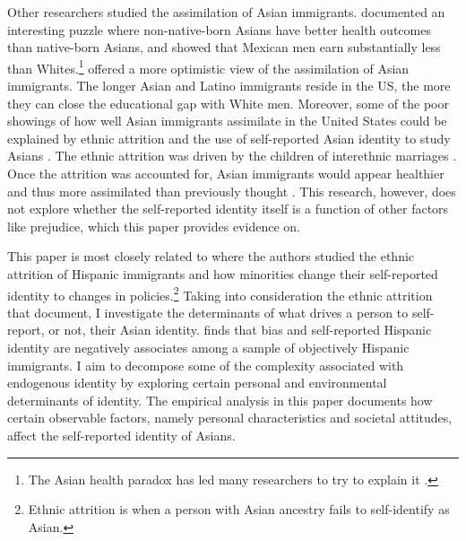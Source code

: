 Other researchers studied the assimilation of Asian immigrants. \textcite{antecolUnhealthyAssimilationWhy2006} documented an interesting puzzle where non-native-born Asians have better health outcomes than native-born Asians, and \textcite{trejoWhyMexicanAmericans1997} showed that Mexican men earn substantially less than Whites.\footnote{The Asian health paradox has led many researchers to try to explain it \autocite{giuntellaAssimilationHealthEvidence2016,giuntellaAccelerationImmigrantUnhealthy2017,giuntellaReasonImmigrationImmigrants2018,giuntellaWhyDoesHealth2017a,antmanEthnicAttritionObserved2016,antmanEthnicAttritionAssimilation2020}.} \textcite{smithAssimilationLatinoGenerations2003} offered a more optimistic view of the assimilation of Asian immigrants. The longer Asian and Latino immigrants reside in the US, the more they can close the educational gap with White men. Moreover, some of the poor showings of how well Asian immigrants assimilate in the United States could be explained by ethnic attrition and the use of self-reported Asian identity to study Asians \autocite{duncanComplexityImmigrantGenerations2017,duncanWhoRemainsMexican2011,mengIntermarriageEconomicAssimilation2005,duncanIdentifyingLaterGenerationDescendants2018,duncanSocioeconomicIntegrationImmigrant2018,antmanEthnicAttritionObserved2016,antmanEthnicAttritionAssimilation2020}. The ethnic attrition was driven by the children of interethnic marriages \autocite{mengIntermarriageEconomicAssimilation2005,duncanEthnicIdentificationIntermarriage2005}. Once the attrition was accounted for, Asian immigrants would appear healthier and thus more assimilated than previously thought \autocite{antmanEthnicAttritionObserved2016,antmanEthnicAttritionAssimilation2020}. This research, however, does not explore whether the self-reported identity itself is a function of other factors like prejudice, which this paper provides evidence on. 

This paper is most closely related to \textcite{hadahforthcominghispanicidentity, antmanEthnicAttritionObserved2016,antmanIncentivesIdentifyRacial2015,antmanAmericanIndianCasinos2021} where the authors studied the ethnic attrition of Hispanic immigrants and how minorities change their self-reported identity to changes in policies.\footnote{Ethnic attrition is when a person with Asian ancestry fails to self-identify as Asian.} Taking into consideration the ethnic attrition that \textcite{antmanEthnicAttritionObserved2016} document, I investigate the determinants of what drives a person to self-report, or not, their Asian identity. \textcite{hadahforthcominghispanicidentity} finds that bias and self-reported Hispanic identity are negatively associates among a sample of objectively Hispanic immigrants. I aim to decompose some of the complexity associated with endogenous identity by exploring certain personal and environmental determinants of identity. The empirical analysis in this paper documents how certain observable factors, namely personal characteristics and societal attitudes, affect the self-reported identity of Asians.

